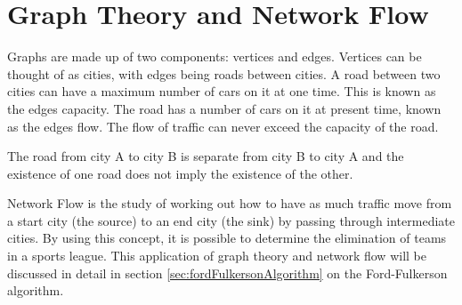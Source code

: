 \section{Graph Theory and Network Flow}
\label{sec:graphTheoryAndNetworkFlow}

Graphs are made up of two components: vertices and edges. Vertices can be
thought of as cities, with edges being roads between cities. A road between
two cities can have a maximum number of cars on it at one time. This is
known as the edges capacity. The road has a number of cars on it at present
time, known as the edges flow. The flow of traffic can never exceed the
capacity of the road.

The road from city A to city B is separate from city B to city A and the
existence of one road does not imply the existence of the other.

Network Flow is the study of working out how to have as much traffic move
from a start city (the source) to an end city (the sink) by passing through 
intermediate cities. By using this concept, it is possible to determine
the elimination of teams in a sports league. This application of graph
theory and network flow will be discussed in detail in section
\ref{sec:fordFulkersonAlgorithm} on the Ford-Fulkerson algorithm.
